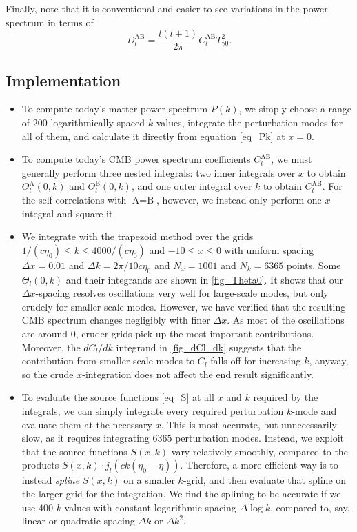 \documentclass[10pt,a4paper]{article}
\begin{document}
Finally, note that it is conventional and easier to see variations in the power spectrum in terms of
\begin{equation}
	D_l^\text{AB} = \frac{l (l+1)}{2 \pi} C_l^\text{AB} T_{\gamma 0}^2 .
\label{eq_Dl}
\end{equation}

\subsection{Implementation}

\begin{itemize}
\item
To compute today's matter power spectrum $P(k)$,
we simply choose a range of $200$ logarithmically spaced $k$-values,
integrate the perturbation modes for all of them,
and calculate it directly from equation \eqref{eq_Pk} at $x=0$.

\item
To compute today's CMB power spectrum coefficients $C_l^\text{AB}$,
we must generally perform three nested integrals:
two inner integrals over $x$ to obtain $\Theta_l^\text{A}(0,k)$ and $\Theta_l^\text{B}(0,k)$,
and one outer integral over $k$ to obtain $C_l^\text{AB}$.
For the self-correlations with $\text{A}=\text{B}$, however,
we instead only perform one $x$-integral and square it.

\item
We integrate with the trapezoid method over the grids
$1/(c\eta_0) \leq k \leq 4000/(c\eta_0)$ and $-10 \leq x \leq 0$
with uniform spacing $\Delta x = 0.01$ and $\Delta k = 2 \pi / 10 c \eta_0$
and $N_x = 1001$ and $N_k = 6365$ points.
Some $\Theta_l(0,k)$ and their integrands are shown in \cref{fig_Theta0}.
It shows that our $\Delta x$-spacing resolves oscillations very well for large-scale modes,
but only crudely for smaller-scale modes.
However, we have verified that the resulting CMB spectrum changes negligibly with finer $\Delta x$.
As most of the oscillations are around $0$, cruder grids pick up the most important contributions.
Moreover, the $d C_l/dk$ integrand in \cref{fig_dCl_dk} suggests that
the contribution from smaller-scale modes to $C_l$ falls off for increasing $k$, anyway,
so the crude $x$-integration does not affect the end result significantly.

\item
To evaluate the source functions \eqref{eq_S} at all $x$ and $k$ required by the integrals,
we can simply integrate every required perturbation $k$-mode and evaluate them at the necessary $x$.
This is most accurate, but unnecessarily slow, as it requires integrating $6365$ perturbation modes.
Instead, we exploit that
the source functions $S(x,k)$ vary relatively smoothly,
compared to the products $S(x,k) \cdot j_l(ck(\eta_0-\eta))$.
Therefore, a more efficient way is to instead \emph{spline} $S(x,k)$ on a smaller $k$-grid,
and then evaluate that spline on the larger grid for the integration.
We find the splining to be accurate if we use $400$ $k$-values with constant logarithmic spacing $\Delta \log k$,
compared to, say, linear or quadratic spacing $\Delta k$ or $\Delta k^2$.


\end{itemize}
\end{document}
